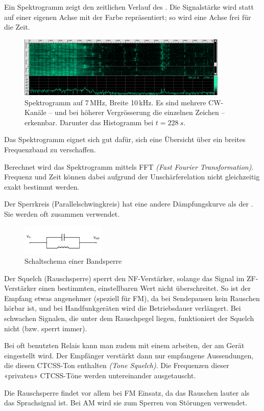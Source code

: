 {}

{Ein Spektrogramm zeigt den zeitlichen Verlauf des . Die Signalstärke wird statt auf einer eigenen Achse mit der Farbe repräsentiert; so wird eine Achse frei für die Zeit.

\begin{figure}[h!]
 \centering
 \includegraphics[width=10cm]{./png/baudline-Spectro-Histo.png}
 \caption{Spektrogramm auf 7\,MHz, Breite 10\,kHz. Es sind mehrere CW-Kanäle -- und bei höherer Vergrösserung die einzelnen Zeichen -- erkennbar. Darunter das Histogramm bei $t=228~s$.}
 \label{fig:baudline}
\end{figure}

Das Spektrogramm eignet sich gut dafür, sich eine Übersicht über ein breites Frequenzband zu verschaffen.

Berechnet wird das Spektrogramm mittels FFT \textit{(Fast Fourier Transformation)}. Frequenz und Zeit können dabei aufgrund der Unschärferelation nicht gleichzeitig exakt bestimmt werden.}

{Der Sperrkreis (Parallelschwingkreis) hat eine andere Dämpfungskurve als der . Sie werden oft zusammen verwendet.

\begin{figure}[h!]
 \centering
 \includegraphics[width=4cm]{./png/Amfu-Schema_Sperrkreis.png}
 \caption{Schaltschema einer Bandsperre}
 \label{fig:sperrkreis}
\end{figure}

}

{Der Squelch (Rauschsperre) sperrt den NF-Verstärker, solange das Signal im ZF-Verstärker einen bestimmten, einstellbaren Wert nicht überschreitet. So ist der Empfang etwas angenehmer (speziell für FM), da bei Sendepausen kein Rauschen hörbar ist, und bei Handfunkgeräten wird die Betriebsdauer verlängert. Bei schwachen Signalen, die unter dem Rauschpegel liegen, funktioniert der Squelch nicht (bzw. sperrt immer).

Bei oft benutzten Relais kann man zudem mit einem  arbeiten, der am Gerät eingestellt wird. Der Empfänger verstärkt dann nur empfangene Aussendungen, die diesen CTCSS-Ton enthalten \textit{(Tone Squelch)}. Die Frequenzen dieser «privaten» CTCSS-Töne werden untereinander ausgetauscht.

Die Rauschsperre findet vor allem bei FM Einsatz, da das Rauschen lauter als das Sprachsignal ist. Bei AM wird sie zum Sperren von Störungen verwendet.}

